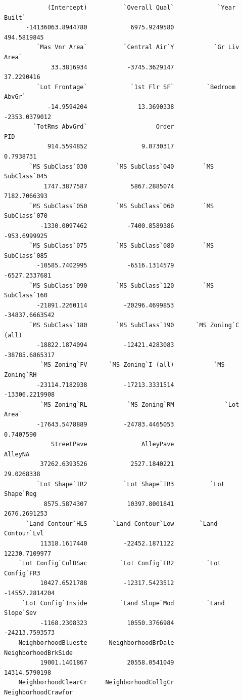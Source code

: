\documentclass[
  letterpaper,
  DIV=11,
  numbers=noendperiod]{scrreprt}
\begin{document}
\begin{verbatim}
            (Intercept)          `Overall Qual`            `Year Built` 
      -14136063.8944780            6975.9249580             494.5819845 
         `Mas Vnr Area`          `Central Air`Y           `Gr Liv Area` 
             33.3816934           -3745.3629147              37.2290416 
         `Lot Frontage`            `1st Flr SF`         `Bedroom AbvGr` 
            -14.9594204              13.3690338           -2353.0379012 
        `TotRms AbvGrd`                   Order                     PID 
            914.5594852               9.0730317               0.7938731 
       `MS SubClass`030        `MS SubClass`040        `MS SubClass`045 
           1747.3877587            5867.2885074            7182.7066393 
       `MS SubClass`050        `MS SubClass`060        `MS SubClass`070 
          -1330.0097462           -7400.8589386            -953.6999925 
       `MS SubClass`075        `MS SubClass`080        `MS SubClass`085 
         -10585.7402995           -6516.1314579           -6527.2337681 
       `MS SubClass`090        `MS SubClass`120        `MS SubClass`160 
         -21891.2260114          -20296.4699853          -34837.6663542 
       `MS SubClass`180        `MS SubClass`190      `MS Zoning`C (all) 
         -18822.1874094          -12421.4283083          -38785.6865317 
          `MS Zoning`FV      `MS Zoning`I (all)           `MS Zoning`RH 
         -23114.7182938          -17213.3331514          -13306.2219908 
          `MS Zoning`RL           `MS Zoning`RM              `Lot Area` 
         -17643.5478889          -24783.4465053               0.7407590 
             StreetPave               AlleyPave                 AlleyNA 
          37262.6393526            2527.1840221              29.0268338 
         `Lot Shape`IR2          `Lot Shape`IR3          `Lot Shape`Reg 
           8575.5874307           10397.8001841            2676.2691253 
      `Land Contour`HLS       `Land Contour`Low       `Land Contour`Lvl 
          11318.1617440          -22452.1871122           12230.7109977 
    `Lot Config`CulDSac         `Lot Config`FR2         `Lot Config`FR3 
          10427.6521788          -12317.5423512          -14557.2814204 
     `Lot Config`Inside         `Land Slope`Mod         `Land Slope`Sev 
          -1168.2308323           10550.3766984          -24213.7593573 
    NeighborhoodBlueste      NeighborhoodBrDale     NeighborhoodBrkSide 
          19001.1401867           20558.0541049           14314.5790198 
    NeighborhoodClearCr     NeighborhoodCollgCr     NeighborhoodCrawfor 

\end{verbatim}
\end{document}
